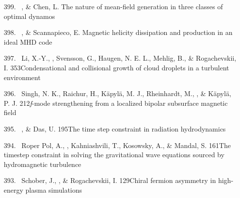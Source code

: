 \begin{itemize}
\item[{399.}~]
\Brandenburg, \& Chen, L.
{The nature of mean-field generation in three classes of optimal dynamos}

\item[{398.}~]
\Brandenburg, \& Scannapieco, E.
{Magnetic helicity dissipation and production in an ideal MHD code}

\item[{397.}~]
Li, X.-Y., \Brandenburg, Svensson, G., Haugen, N. E. L., Mehlig, B., \& Rogachevskii, I.
{353}{Condensational and collisional growth of cloud droplets in a turbulent environment}

\item[{396.}~]
Singh, N. K., Raichur, H., K\"apyl\"a, M. J., Rheinhardt, M., \Brandenburg, \& K\"apyl\"a, P. J.
{212}{{\em f}-mode strengthening from a localized bipolar subsurface magnetic field}

\item[{395.}~]
\Brandenburg, \& Das, U.
{195}{The time step constraint in radiation hydrodynamics}

\item[{394.}~]
Roper Pol, A., \Brandenburg, Kahniashvili, T., Kosowsky, A., \& Mandal, S.
{161}{The timestep constraint in solving the gravitational wave equations sourced by hydromagnetic turbulence}

\item[{393.}~]
Schober, J., \Brandenburg, \& Rogachevskii, I.
{129}{Chiral fermion asymmetry in high-energy plasma simulations}


\end{itemize}
